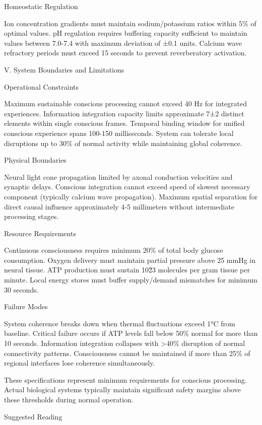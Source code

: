 \begin{refsection}
Homeostatic Regulation

Ion concentration gradients must maintain sodium/potassium ratios within 5\% of optimal values. pH regulation requires buffering capacity sufficient to maintain values between 7.0-7.4 with maximum deviation of ±0.1 units. Calcium wave refractory periods must exceed 15 seconds to prevent reverberatory activation.

V. System Boundaries and Limitations

Operational Constraints

Maximum sustainable conscious processing cannot exceed 40 Hz for integrated experiences. Information integration capacity limits approximate 7±2 distinct elements within single conscious frames. Temporal binding window for unified conscious experience spans 100-150 milliseconds. System can tolerate local disruptions up to 30\% of normal activity while maintaining global coherence.

Physical Boundaries

Neural light cone propagation limited by axonal conduction velocities and synaptic delays. Conscious integration cannot exceed speed of slowest necessary component (typically calcium wave propagation). Maximum spatial separation for direct causal influence approximately 4-5 millimeters without intermediate processing stages.

Resource Requirements

Continuous consciousness requires minimum 20\% of total body glucose consumption. Oxygen delivery must maintain partial pressure above 25 mmHg in neural tissue. ATP production must sustain 10\^23 molecules per gram tissue per minute. Local energy stores must buffer supply/demand mismatches for minimum 30 seconds.

Failure Modes

System coherence breaks down when thermal fluctuations exceed 1°C from baseline. Critical failure occurs if ATP levels fall below 50\% normal for more than 10 seconds. Information integration collapses with >40\% disruption of normal connectivity patterns. Consciousness cannot be maintained if more than 25\% of regional interfaces lose coherence simultaneously.

These specifications represent minimum requirements for conscious processing. Actual biological systems typically maintain significant safety margins above these thresholds during normal operation.

Suggested Reading


\end{refsection}
